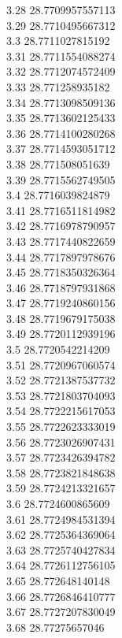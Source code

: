 {3.28	28.7709957557113\\
3.29	28.7710495667312\\
3.3	28.7711027815192\\
3.31	28.7711554088274\\
3.32	28.7712074572409\\
3.33	28.771258935182\\
3.34	28.7713098509136\\
3.35	28.7713602125433\\
3.36	28.7714100280268\\
3.37	28.7714593051712\\
3.38	28.771508051639\\
3.39	28.7715562749505\\
3.4	28.7716039824879\\
3.41	28.7716511814982\\
3.42	28.7716978790957\\
3.43	28.7717440822659\\
3.44	28.7717897978676\\
3.45	28.7718350326364\\
3.46	28.7718797931868\\
3.47	28.7719240860156\\
3.48	28.7719679175038\\
3.49	28.7720112939196\\
3.5	28.7720542214209\\
3.51	28.7720967060574\\
3.52	28.7721387537732\\
3.53	28.7721803704093\\
3.54	28.7722215617053\\
3.55	28.7722623333019\\
3.56	28.7723026907431\\
3.57	28.7723426394782\\
3.58	28.7723821848638\\
3.59	28.7724213321657\\
3.6	28.7724600865609\\
3.61	28.7724984531394\\
3.62	28.7725364369064\\
3.63	28.7725740427834\\
3.64	28.7726112756105\\
3.65	28.772648140148\\
3.66	28.7726846410777\\
3.67	28.7727207830049\\
3.68	28.77275657046\\
}
